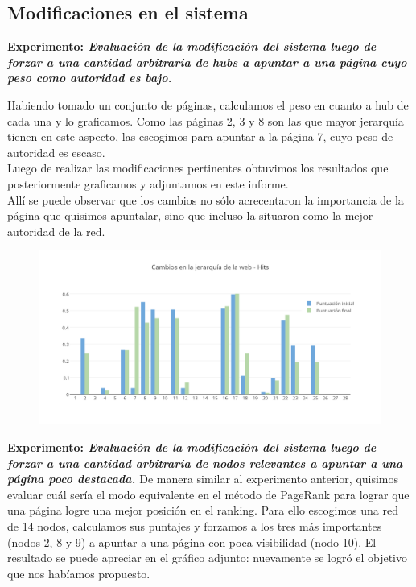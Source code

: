 \documentclass[a4paper]{article}
\begin{document}
\newpage
\subsection{Modificaciones en el sistema}

\textbf{Experimento: \itshape{Evaluación de la modificación del sistema luego de forzar a una cantidad arbitraria de hubs a apuntar a una página cuyo peso como autoridad es bajo. }}

Habiendo tomado un conjunto de páginas, calculamos el peso en cuanto a hub de cada una y lo graficamos. Como las páginas 2, 3 y 8 son las que mayor jerarquía tienen en este aspecto, las escogimos para apuntar a la página 7, cuyo peso de autoridad es escaso.\\
Luego de realizar las modificaciones pertinentes obtuvimos los resultados que posteriormente graficamos y adjuntamos en este informe.\\
Allí se puede observar que los cambios no sólo acrecentaron la importancia de la página que quisimos apuntalar, sino que incluso la situaron como la mejor autoridad de la red.

\begin{figure}[h!]
  \begin{center}
	\includegraphics[scale=0.66]{imagenes/cambioshits.png}
	\caption{}
	\label{cambioshits}
  \end{center}
\end{figure}
\newpage
\textbf{Experimento: \itshape{Evaluación de la modificación del sistema luego de forzar a una cantidad arbitraria de nodos relevantes a apuntar a una página poco destacada.}}
De manera similar al experimento anterior, quisimos evaluar cuál sería el modo equivalente en el método de PageRank para lograr que una página logre una mejor posición en el ranking.
Para ello escogimos una red de 14 nodos, calculamos sus puntajes y forzamos a los tres más importantes (nodos 2, 8 y 9) a apuntar a una página con poca visibilidad (nodo 10). El resultado se puede apreciar en el gráfico adjunto: nuevamente se logró el objetivo que nos habíamos propuesto.
\end{document}
